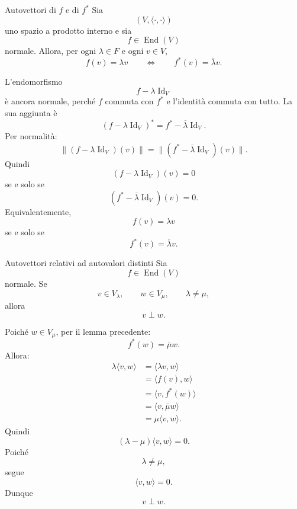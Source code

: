 \documentclass[a4paper]{article}
\begin{document}
\begin{snippetlemma}{Autovettori di \(f\) e di \(f^*\)}
    Sia
    \[
        (V,\langle\cdot,\cdot\rangle)
    \]
    uno spazio a prodotto interno e sia
    \[
        f\in\operatorname{End}(V)
    \]
    normale. Allora, per ogni \(\lambda\in F\) e ogni \(v\in V\),
    \[
        f(v)=\lambda v
        \qquad
        \Longleftrightarrow
        \qquad
        f^*(v)=\overline{\lambda}v.
    \]
\end{snippetlemma}

\begin{snippetproof}{}
    L'endomorfismo
    \[
        f-\lambda\operatorname{Id}_V
    \]
    è ancora normale, perché \(f\) commuta con \(f^*\) e l'identità commuta con tutto. La sua aggiunta è
    \[
        (f-\lambda\operatorname{Id}_V)^*
        =
        f^*-\overline{\lambda}\operatorname{Id}_V.
    \]
    Per normalità:
    \[
        \|(f-\lambda\operatorname{Id}_V)(v)\|
        =
        \|(f^*-\overline{\lambda}\operatorname{Id}_V)(v)\|.
    \]
    Quindi
    \[
        (f-\lambda\operatorname{Id}_V)(v)=0
    \]
    se e solo se
    \[
        (f^*-\overline{\lambda}\operatorname{Id}_V)(v)=0.
    \]
    Equivalentemente,
    \[
        f(v)=\lambda v
    \]
    se e solo se
    \[
        f^*(v)=\overline{\lambda}v.
    \]
\end{snippetproof}

\begin{snippetlemma}{Autovettori relativi ad autovalori distinti}
    Sia
    \[
        f\in\operatorname{End}(V)
    \]
    normale. Se
    \[
        v\in V_\lambda,
        \qquad
        w\in V_\mu,
        \qquad
        \lambda\neq\mu,
    \]
    allora
    \[
        v\perp w.
    \]
\end{snippetlemma}

\begin{snippetproof}{}
    Poiché \(w\in V_\mu\), per il lemma precedente:
    \[
        f^*(w)=\overline{\mu}w.
    \]
    Allora:
    \begin{align*}
        \lambda\langle v,w\rangle
        &=
        \langle \lambda v,w\rangle\\
        &=
        \langle f(v),w\rangle\\
        &=
        \langle v,f^*(w)\rangle\\
        &=
        \langle v,\overline{\mu}w\rangle\\
        &=
        \mu\langle v,w\rangle.
    \end{align*}
    Quindi
    \[
        (\lambda-\mu)\langle v,w\rangle=0.
    \]
    Poiché
    \[
        \lambda\neq\mu,
    \]
    segue
    \[
        \langle v,w\rangle=0.
    \]
    Dunque
    \[
        v\perp w.
    \]
\end{snippetproof}
\end{document}
